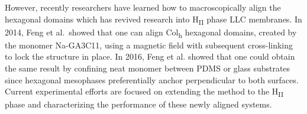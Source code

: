 \documentclass[journal=jpcbfk,manuscript=article]{achemso}
\begin{document}


  However, recently researchers have learned how to macroscopically align the
  hexagonal domains which has revived research into H\textsubscript{II} phase LLC
  membranes. In 2014, Feng et al.~showed that one can align Col\textsubscript{h}
  hexagonal domains, created by the monomer Na-GA3C11, using a magnetic field
  with subsequent cross-linking to lock the structure in
  place\cite{feng_scalable_2014}. In 2016, Feng et al. showed that one could
  obtain the same result by confining neat monomer between PDMS or glass
  substrates since hexagonal mesophases preferentially anchor perpendicular to
  both surfaces\cite{feng_thin_2016}.
  Current experimental efforts are focused on extending the method to the
  H\textsubscript{II} phase and characterizing the performance of these newly
  aligned systems.
\end{document}
